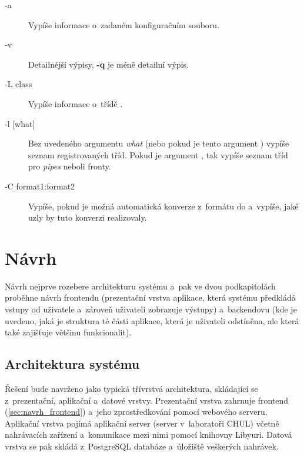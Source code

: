 \documentclass[thesis=M,czech]{FITthesis}[2012/06/26]
\begin{document}
\begin{description}
\begin{description}
	\item[-a] Vypíše informace o~zadaném konfiguračním souboru.
	\item[-v] Detailnější výpisy, \textbf{-q} je méně detailní výpis.
	\item[-L class] Vypíše informace o~třídě .
	\item[-l {[what]}] Bez uvedeného argumentu \textit{what} (nebo pokud je tento argument ) vypíše seznam registrovaných tříd. Pokud je argument , tak vypíše seznam tříd pro \textit{pipes} neboli fronty.
	\item[-C format1:format2] Vypíše, pokud je možná automatická konverze z~formátu  do  a~vypíše, jaké uzly by tuto konverzi realizovaly.
\end{description}

\end{description}


\chapter{Návrh} \label{chap:navrh}
Návrh nejprve rozebere architekturu systému a~pak ve dvou podkapitolách proběhne návrh frontendu (prezentační vrstva aplikace, která systému předkládá vstupy od uživatele a~zároveň uživateli zobrazuje výstupy) a~backendovu (kde je uvedeno, jaká je struktura té části aplikace, která je uživateli odstíněna, ale která také zajišťuje většinu funkcionalit).

\section{Architektura systému} \label{sec:navrh_architektura}
Řešení bude navrženo jako typická třívrstvá architektura, skládající se z~prezentační, aplikační a~datové vrstvy. Prezentační vrstva zahrnuje frontend (\ref{sec:navrh_frontend}) a~jeho zprostředkování pomocí webového serveru. Aplikační vrstva pojímá aplikační server (server v~laboratoři CHUL) včetně nahrávacích zařízení a~komunikace mezi nimi pomocí knihovny Libyuri. Datová vrstva se pak skládá z~PostgreSQL databáze a~úložiště veškerých nahrávek.
\end{document}
